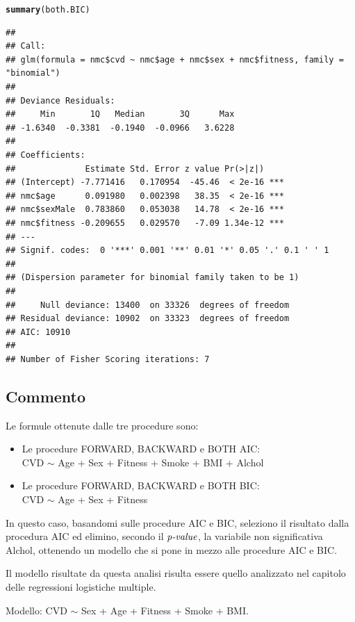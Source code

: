\documentclass{article}\usepackage[]{graphicx}\usepackage[]{xcolor}
\makeatletter
\newcommand{\hlstd}[1]{\textcolor[rgb]{0.345,0.345,0.345}{#1}}%
\newcommand{\hlkwd}[1]{\textcolor[rgb]{0.737,0.353,0.396}{\textbf{#1}}}%
\newenvironment{kframe}{%
 \def\at@end@of@kframe{}%
 \ifinner\ifhmode%
  \def\at@end@of@kframe{\end{minipage}}%
  \begin{minipage}{\columnwidth}%
 \fi\fi%
 \def\FrameCommand##1{\hskip\@totalleftmargin \hskip-\fboxsep
 \colorbox{shadecolor}{##1}\hskip-\fboxsep
     \hskip-\linewidth \hskip-\@totalleftmargin \hskip\columnwidth}%
 \MakeFramed {\advance\hsize-\width
   \@totalleftmargin\z@ \linewidth\hsize
   \@setminipage}}%
 {\par\unskip\endMakeFramed%
 \at@end@of@kframe}
\newenvironment{knitrout}{}{} %
\makeatother
\begin{document}
\begin{knitrout}
\begin{kframe}
\begin{verbatim}
\end{verbatim}
\begin{alltt}
\hlkwd{summary}\hlstd{(both.BIC)}
\end{alltt}
\begin{verbatim}
## 
## Call:
## glm(formula = nmc$cvd ~ nmc$age + nmc$sex + nmc$fitness, family = "binomial")
## 
## Deviance Residuals: 
##     Min       1Q   Median       3Q      Max  
## -1.6340  -0.3381  -0.1940  -0.0966   3.6228  
## 
## Coefficients:
##              Estimate Std. Error z value Pr(>|z|)    
## (Intercept) -7.771416   0.170954  -45.46  < 2e-16 ***
## nmc$age      0.091980   0.002398   38.35  < 2e-16 ***
## nmc$sexMale  0.783860   0.053038   14.78  < 2e-16 ***
## nmc$fitness -0.209655   0.029570   -7.09 1.34e-12 ***
## ---
## Signif. codes:  0 '***' 0.001 '**' 0.01 '*' 0.05 '.' 0.1 ' ' 1
## 
## (Dispersion parameter for binomial family taken to be 1)
## 
##     Null deviance: 13400  on 33326  degrees of freedom
## Residual deviance: 10902  on 33323  degrees of freedom
## AIC: 10910
## 
## Number of Fisher Scoring iterations: 7
\end{verbatim}
\end{kframe}
\end{knitrout}
    
    \subsection{Commento}
      Le formule ottenute dalle tre procedure sono:
        \begin{itemize}
          \item Le procedure FORWARD, BACKWARD e BOTH AIC: \\
                CVD $\sim$ Age + Sex + Fitness + Smoke + BMI + Alchol
          \item Le procedure FORWARD, BACKWARD e BOTH BIC: \\
                CVD $\sim$ Age + Sex + Fitness
        \end{itemize}
        
      In questo caso, basandomi sulle procedure AIC e BIC, 
      seleziono il risultato dalla procedura AIC ed elimino, secondo il
      $\emph{p-value}$, la variabile non significativa Alchol, ottenendo un modello
      che si pone in mezzo alle procedure AIC e BIC. \par
      Il modello risultate da questa analisi risulta essere quello analizzato
      nel capitolo delle regressioni logistiche multiple. \par
      Modello: CVD $\sim$ Sex + Age + Fitness + Smoke + BMI. \par
\end{document}
